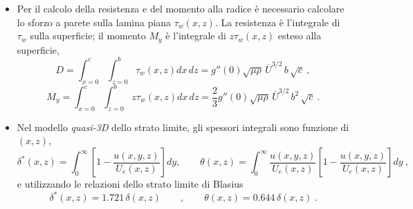  \begin{itemize}
 
 \item 
 Per il calcolo della resistenza e del momento alla radice è necessario calcolare
 lo sforzo a parete sulla lamina piana $\tau_w (x,z)$. La resistenza è l'integrale
 di $\tau_w$ sulla superficie; il momento $M_y$ è l'integrale di $z \tau_w (x,z)$
 esteso alla superficie,
\begin{equation}
  D = \int_{x=0}^{c} \int_{z=0}^b \tau_w(x,z) dx \, dz = 
    g''(0) \sqrt{ \mu \rho } \, \overline{U}^{3/2} \, b \, \sqrt{c} \ ,
\end{equation}
\begin{equation}
  M_y = \int_{x=0}^{c} \int_{z=0}^b z \tau_w(x,z) dx \, dz = 
    \dfrac{2}{3} g''(0) \sqrt{ \mu \rho } \, \overline{U}^{3/2} \, b^2 \, \sqrt{c} \ .
\end{equation}

 \item
  Nel modello \textit{quasi-3D} dello strato limite, gli spessori integrali sono funzione di $(x,z)$,
  \begin{equation}
   \delta^*(x,z) = \int_0^\infty \displaystyle\left[ 1 - \frac{u(x,y,z)}{U_e(x,z)} \right] dy ,\qquad
   \theta(x,z) = \int_0^\infty \frac{u(x,y,z)}{U_e(x,z)} \displaystyle\left[ 1 - \frac{u(x,y,z)}{U_e(x,z)} \right] dy \ ,  
  \end{equation}
  e utilizzando le relazioni dello strato limite di Blasius
 \begin{equation}
     \delta^*(x,z) = 1.721 \, \delta(x,z) \qquad , \qquad
       \theta(x,z) = 0.644 \, \delta(x,z) \ .
 \end{equation}


\end{itemize}
